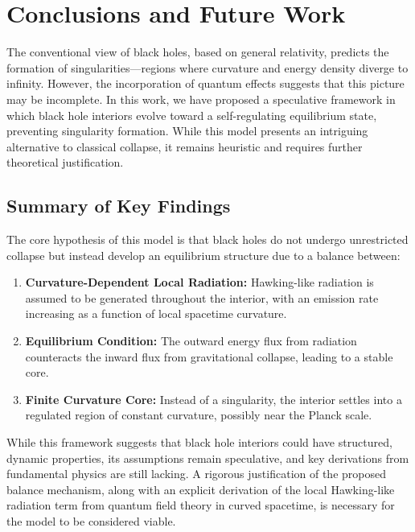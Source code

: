 \section{Conclusions and Future Work}
\label{sec:conclusions}

The conventional view of black holes, based on general relativity, predicts the formation of singularities—regions where curvature and energy density diverge to infinity. However, the incorporation of quantum effects suggests that this picture may be incomplete. In this work, we have proposed a speculative framework in which black hole interiors evolve toward a self-regulating equilibrium state, preventing singularity formation. While this model presents an intriguing alternative to classical collapse, it remains heuristic and requires further theoretical justification.

\subsection{Summary of Key Findings}
The core hypothesis of this model is that black holes do not undergo unrestricted collapse but instead develop an equilibrium structure due to a balance between:
\begin{enumerate}
    \item \textbf{Curvature-Dependent Local Radiation:} Hawking-like radiation is assumed to be generated throughout the interior, with an emission rate increasing as a function of local spacetime curvature.
    \item \textbf{Equilibrium Condition:} The outward energy flux from radiation counteracts the inward flux from gravitational collapse, leading to a stable core.
    \item \textbf{Finite Curvature Core:} Instead of a singularity, the interior settles into a regulated region of constant curvature, possibly near the Planck scale.
\end{enumerate}

While this framework suggests that black hole interiors could have structured, dynamic properties, its assumptions remain speculative, and key derivations from fundamental physics are still lacking. A rigorous justification of the proposed balance mechanism, along with an explicit derivation of the local Hawking-like radiation term from quantum field theory in curved spacetime, is necessary for the model to be considered viable.

